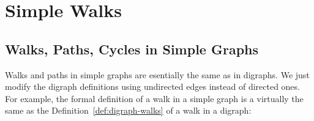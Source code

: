 \begin{problems}
\practiceproblems
{}

\classproblems
{}

\homeworkproblems
{}

\examproblems
{}

\end{problems}



\section{Simple Walks}\label{sec:connectedness}

\subsection{Walks, Paths, Cycles in Simple Graphs}
Walks and paths in simple graphs are esentially the same as in digraphs.
We just modify the digraph definitions using undirected edges instead of directed
ones.  For example, the formal definition of a walk in a simple graph is a virtually
the same as the Definition~\ref{def:digraph-walks} of a walk in a digraph:

